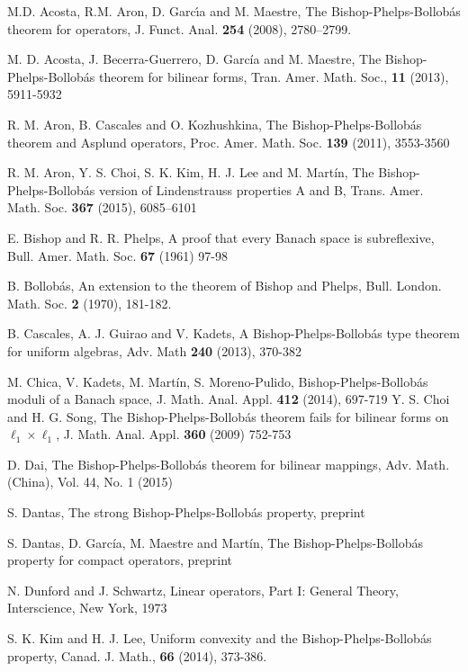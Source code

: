 \documentclass[12pt,a4paper]{amsart}
\theoremstyle{definition}
\numberwithin{equation}{section}
\begin{document}
\begin{thebibliography}{}

M.D. Acosta, R.M. Aron, D. Garc\'{\i}a and M. Maestre, The Bishop-Phelps-Bollob\'as theorem for operators, J. Funct. Anal. {\bf 254} (2008),
 2780--2799.

 M. D. Acosta, J. Becerra-Guerrero, D. Garc\'ia and M. Maestre, The Bishop-Phelps-Bollob\'as theorem for bilinear forms, Tran. Amer. Math. Soc., {\bf 11} (2013), 5911-5932

 R. M. Aron, B. Cascales and O. Kozhushkina, The Bishop-Phelps-Bollob\'as theorem and Asplund operators, Proc. Amer. Math. Soc. {\bf 139} (2011), 3553-3560

 R. M. Aron, Y. S. Choi, S. K. Kim, H. J. Lee and M. Mart\'in, The Bishop-Phelps-Bollob\'as version
of Lindenstrauss properties A and B, Trans. Amer. Math. Soc. {\bf 367} (2015), 6085--6101

 E. Bishop and R. R. Phelps, A proof that every Banach space is subreflexive, Bull. Amer. Math. Soc. {\bf 67} (1961) 97-98

 B. Bollob\'as, An extension to the theorem of Bishop and Phelps, Bull. London. Math. Soc. {\bf 2} (1970), 181-182.

 B. Cascales, A. J. Guirao and V. Kadets, A Bishop-Phelps-Bollob\'as type theorem for uniform algebras, Adv. Math {\bf 240} (2013), 370-382

 M. Chica, V. Kadets, M. Mart\'in, S. Moreno-Pulido, Bishop-Phelps-Bollob\'as moduli of a Banach space, J. Math. Anal. Appl. {\bf 412} (2014), 697-719	
 Y. S. Choi and H. G. Song, The Bishop-Phelps-Bollob\'as theorem fails for bilinear forms on $\ell_1 \times \ell_1$, J. Math. Anal. Appl. {\bf 360} (2009) 752-753

 D. Dai, The Bishop-Phelps-Bollob\'as theorem for bilinear mappings, Adv. Math. (China), Vol. 44, No. 1 (2015)

 S. Dantas, The strong Bishop-Phelps-Bollob\'as property, preprint

 S. Dantas, D. Garc\'ia, M. Maestre and Mart\'in, The Bishop-Phelps-Bollob\'as property for compact operators, preprint

 N. Dunford and J. Schwartz, Linear operators, Part I: General Theory, Interscience, New York, 1973

 S. K. Kim and H. J. Lee, Uniform convexity and the Bishop-Phelps-Bollob\'as property, Canad. J. Math., {\bf 66} (2014), 373-386.


\end{thebibliography}
\end{document}
